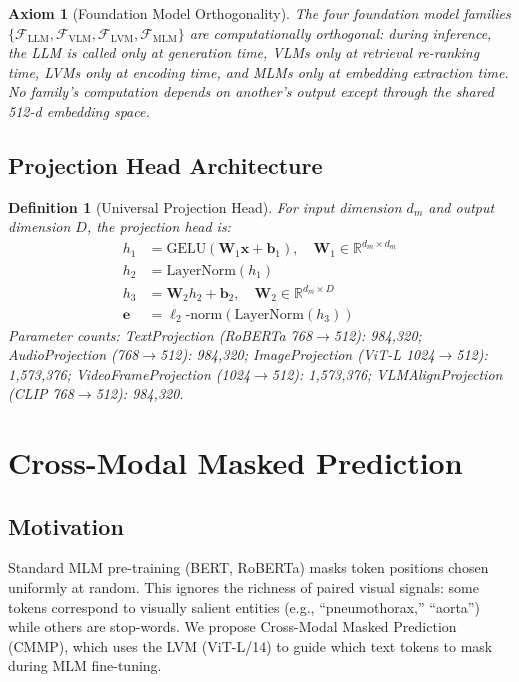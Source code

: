\documentclass[10pt,conference]{IEEEtran}
\theoremstyle{ieeethm}
\theoremstyle{ieeedef}
\newtheorem{definition}[theorem]{Definition}
\newtheorem{axiom}{Axiom}
\theoremstyle{ieeeremark}
\begin{document}
\begin{axiom}[Foundation Model Orthogonality]
\label{ax:orthogonality}
The four foundation model families $\{\mathcal{F}_\text{LLM}, \mathcal{F}_\text{VLM}, \mathcal{F}_\text{LVM}, \mathcal{F}_\text{MLM}\}$ are \emph{computationally orthogonal}: during inference, the LLM is called only at generation time, VLMs only at retrieval re-ranking time, LVMs only at encoding time, and MLMs only at embedding extraction time. No family's computation depends on another's output except through the shared 512-d embedding space.
\end{axiom}

\subsection{Projection Head Architecture}

\begin{definition}[Universal Projection Head]
\label{def:proj_head}
For input dimension $d_m$ and output dimension $D$, the projection head is:
\begin{align}
h_1 &= \text{GELU}(\mathbf{W}_1 \mathbf{x} + \mathbf{b}_1),\quad \mathbf{W}_1 \in \mathbb{R}^{d_m \times d_m} \label{eq:proj1}\\
h_2 &= \text{LayerNorm}(h_1) \label{eq:proj2}\\
h_3 &= \mathbf{W}_2 h_2 + \mathbf{b}_2,\quad \mathbf{W}_2 \in \mathbb{R}^{d_m \times D} \label{eq:proj3}\\
\mathbf{e} &= \ell_2\text{-norm}(\text{LayerNorm}(h_3)) \label{eq:proj4}
\end{align}
Parameter counts: TextProjection (RoBERTa 768$\to$512): 984,320; AudioProjection (768$\to$512): 984,320; ImageProjection (ViT-L 1024$\to$512): 1,573,376; VideoFrameProjection (1024$\to$512): 1,573,376; VLMAlignProjection (CLIP 768$\to$512): 984,320.
\end{definition}

\section{Cross-Modal Masked Prediction}
\label{sec:cmmp}

\subsection{Motivation}

Standard MLM pre-training (BERT, RoBERTa) masks token positions chosen uniformly at random. This ignores the richness of paired visual signals: some tokens correspond to visually salient entities (e.g., ``pneumothorax,'' ``aorta'') while others are stop-words. We propose Cross-Modal Masked Prediction (CMMP), which uses the LVM (ViT-L/14) to guide which text tokens to mask during MLM fine-tuning.
\end{document}
